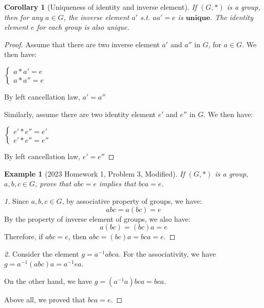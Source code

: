 \documentclass{article}
\theoremstyle{MyNonumberplain}
\theoremstyle{break}
\newtheorem*{proof}{Proof. }
\theoremstyle{break}
\newtheorem{corollary}{Corollary}[theorem]
\newtheorem{example}{Example}[section]
\theoremstyle{break}
\theoremstyle{definition}
\theoremstyle{break}
\begin{document}
\begin{thmbox}
    \begin{corollary}[Uniqueness of identity and inverse element]
        If $(G,*)$ is a group, then for any $a\in G$, the inverse element $a'$ s.t. $aa'=e$ is $\mathbf{unique}$.\bigskip
        The identity element $e$ for each group is also unique.
    \end{corollary}
    \begin{prfbox}
        \begin{proof}
            Assume that there are two inverse element $a'$ and $a''$ in $G$, for $a\in G$. We then have:\bigskip
            \begin{center}
                $\left\{\begin{array}{l}
                    a \ast a' = e\\
                    a \ast a'' = e
                  \end{array}\right.$    
            \end{center}
            By left cancellation law, $a'=a''$\bigskip

            Similarly, assume there are two identity element $e'$ and $e''$ in $G$. We then have:\bigskip
            \begin{center}
                $\left\{\begin{array}{l}
                    e' \ast e'' = e'\\
                    e' \ast e'' = e''
                  \end{array}\right.$
            \end{center}
            By left cancellation law, $e'=e''$
        \end{proof}
    \end{prfbox}
\end{thmbox}

\begin{expbox}
    \begin{example}[2023 Homework 1, Problem 3, Modified]
        If $(G, *)$ is a group, $a, b, c \in G$, prove that $abc = e$ implies that $bca = e$. 
    \end{example}
    \begin{prfbox}
        \begin{proof}[1]
            Since $a,b,c\in G$, by associative property of groups, we have:
            $$abc=a(bc)=e$$
            By the property of inverse element of groups, we also have:
            $$a(bc)=(bc)a=e$$
            Therefore, if $abc=e$, then $abc=(bc)a=bca=e$.              
        \end{proof}
    \end{prfbox}
    \begin{prfbox}
        \begin{proof}[2]
            Consider the element $g=a^{-1}abca$. For the associativity, we have $g=a^{-1}(abc)a=a^{-1}ea$.\bigskip

            On the other hand, we have $g=(a^{-1}a)bca=bca$.\bigskip

            Above all, we proved that $bca=e$.
        \end{proof}
    \end{prfbox}
\end{expbox}
\end{document}
